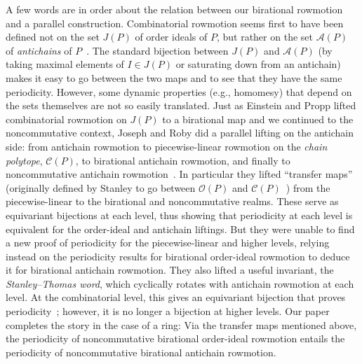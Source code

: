 \documentclass[numbers=enddot,12pt,final,onecolumn,notitlepage]{scrartcl}%
\theoremstyle{definition}
\begin{document}
A few words are in order about the relation between our birational rowmotion
and a parallel construction. Combinatorial rowmotion seems first to have been
defined not on the set $J\left(  P\right)  $ of order ideals of $P$, but
rather on the set $\mathcal{A}\left(  P\right)  $ of \emph{antichains} of
$P$~\cite{brouwer-schrijver}. The standard bijection between $J(P)$ and
$\mathcal{A}(P)$ (by taking maximal elements of $I\in J(P)$ or saturating down
from an antichain) makes it easy to go between the two maps and to see that
they have the same periodicity. However, some dynamic properties (e.g.,
homomesy) that depend on the sets themselves are not so easily translated.
Just as Einstein and Propp lifted combinatorial rowmotion on $J\left(
P\right)  $ to a birational map and we continued to the noncommutative
context, Joseph and Roby did a parallel lifting on the antichain side: from
antichain rowmotion to piecewise-linear rowmotion on the \emph{chain
polytope}, $\mathcal{C}(P)$, to birational antichain rowmotion, and finally to
noncommutative antichain rowmotion~\cite{JosRob20,JosRob21}. In particular
they lifted ``transfer maps'' (originally defined by Stanley to go between
$\mathcal{O}(P)$ and $\mathcal{C}(P)$~\cite{stanley-polytopes}) from the
piecewise-linear to the birational and noncommutative realms. These serve as
equivariant bijections at each level, thus showing that periodicity at each
level is equivalent for the order-ideal and antichain liftings. But they were
unable to find a new proof of periodicity for the piecewise-linear and higher
levels, relying instead on the periodicity results for birational order-ideal
rowmotion to deduce it for birational antichain rowmotion. They also lifted a
useful invariant, the \emph{Stanley--Thomas word}, which cyclically rotates
with antichain rowmotion at each level. At the combinatorial level, this gives
an equivariant bijection that proves periodicity~\cite[\S ~3.3.2]{propp-roby};
however, it is no longer a bijection at higher levels. Our paper completes the
story in the case of a ring: Via the transfer maps mentioned above, the
periodicity of noncommutative birational order-ideal rowmotion entails the
periodicity of noncommutative birational antichain rowmotion.

\end{document}
